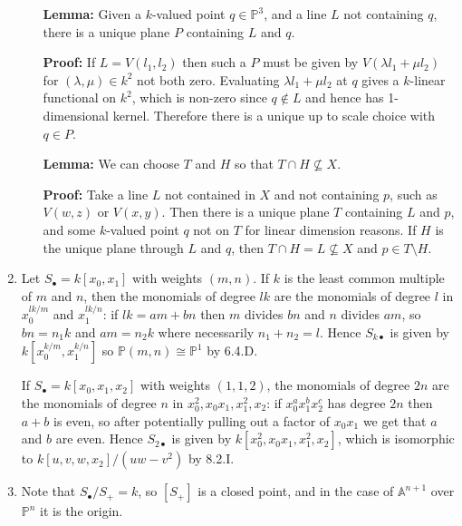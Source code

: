 \documentclass{report}
\newcommand{\A}{\mathbb{A}}
\renewcommand{\P}{\mathbb{P}} %
\begin{document}
\begin{enumerate}[label=\textbf{8.2.\Alph*.}]
\begin{enumerate}[label=(\alph*)]
		            \textbf{Lemma:} Given a $k$-valued point $q\in\P^3$, and a line
		            $L$ not containing $q$, there is a unique plane $P$ containing
		            $L$ and $q$.

		            \textbf{Proof:} If $L=V(l_1,l_2)$ then such a $P$ must be given
		            by $V(\lambda l_1+\mu l_2)$ for $(\lambda,\mu)\in k^2$ not both
		            zero. Evaluating $\lambda l_1+\mu l_2$ at $q$ gives a $k$-linear
		            functional on $k^2$, which is non-zero since $q\notin L$ and
		            hence has 1-dimensional kernel. Therefore there is a unique up
		            to scale choice with $q\in P$.

		            \textbf{Lemma:} We can choose $T$ and $H$ so that
		            $T\cap H\not\subseteq X$.

		            \textbf{Proof:} Take a line $L$ not contained in $X$ and not
		            containing $p$, such as $V(w,z)$ or $V(x,y)$. Then there is a
		            unique plane $T$ containing $L$ and $p$, and some $k$-valued
		            point $q$ not on $T$ for linear dimension reasons. If $H$ is the
		            unique plane through $L$ and $q$, then
		            $T\cap H=L\not\subseteq X$ and $p\in T\setminus H$.
	      \end{enumerate}

	\item Let $S_\bullet=k[x_0,x_1]$ with weights $(m,n)$. If $k$ is the least
	      common multiple of $m$ and $n$, then the monomials of degree $lk$ are
	      the monomials of degree $l$ in $x_0^{lk/m}$ and $x_1^{lk/n}$: if
	      $lk=am+bn$ then $m$ divides $bn$ and $n$ divides $am$, so $bn=n_1k$
	      and $am=n_2k$ where necessarily $n_1+n_2=l$. Hence $S_{k\bullet}$ is
	      given by $k[x_0^{k/m},x_1^{k/n}]$ so $\P(m,n)\cong\P^1$ by 6.4.D.

	      If $S_\bullet=k[x_0,x_1,x_2]$ with weights $(1,1,2)$, the monomials of
	      degree $2n$ are the monomials of degree $n$ in
	      $x_0^2,x_0x_1,x_1^2,x_2$: if $x_0^ax_1^bx_2^c$ has degree $2n$ then
	      $a+b$ is even, so after potentially pulling out a factor of $x_0x_1$
	      we get that $a$ and $b$ are even. Hence $S_{2\bullet}$ is given by
	      $k[x_0^2,x_0x_1,x_1^2,x_2]$, which is isomorphic to
	      $k[u,v,w,x_2]/(uw-v^2)$ by 8.2.I.

	\item Note that $S_\bullet/S_+=k$, so $[S_+]$ is a closed point, and in
	      the case of $\A^{n+1}$ over $\P^n$ it is the origin.


\end{enumerate}
\end{document}
